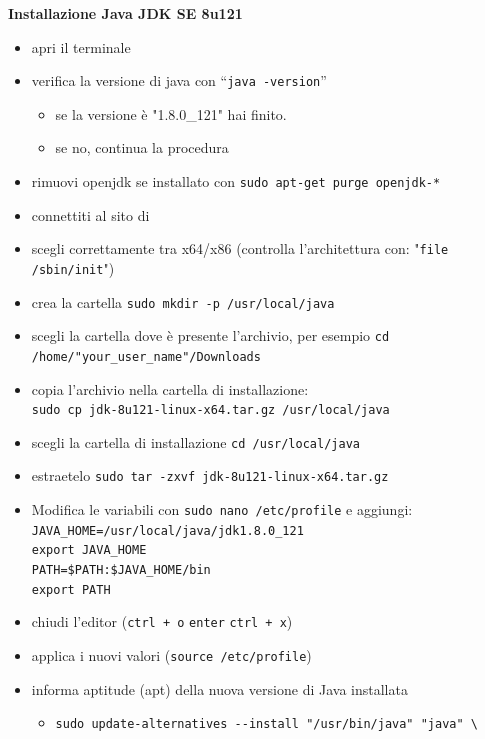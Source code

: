 \documentclass{article}
\begin{document}
\textbf{Installazione Java JDK SE 8u121}
\begin{itemize}
\item apri il terminale
\item  verifica la versione di java con ``\texttt{java -version}''
\begin{itemize}
\item se la versione \`e "1.8.0\_121" hai finito.
\item se no, continua la procedura
\end{itemize}
\item rimuovi openjdk se installato con \texttt{sudo apt-get purge openjdk-*}
\item connettiti al sito di
  \href{http://www.oracle.com/technetwork/java/javase/downloads/jdk8-downloads-2133151.html}{}
\item scegli correttamente tra x64/x86 (controlla l'architettura con:  "\texttt{file /sbin/init}")
\item crea la cartella \texttt{sudo mkdir -p /usr/local/java}
\item scegli la cartella dove \`e presente l'archivio, per esempio \texttt{cd /home/"your\_user\_name"/Downloads}
\item copia l'archivio nella cartella di installazione:\\
	\verb!sudo cp jdk-8u121-linux-x64.tar.gz /usr/local/java!
\item scegli la cartella di installazione \texttt{cd /usr/local/java}
\item estraetelo \texttt{sudo tar -zxvf jdk-8u121-linux-x64.tar.gz}
\item Modifica le variabili con \texttt{sudo nano /etc/profile}  e
  aggiungi: \\
\texttt{JAVA\_HOME=/usr/local/java/jdk1.8.0\_121} \\
\texttt{export JAVA\_HOME}\\
\texttt{PATH=\$PATH:\$JAVA\_HOME/bin}\\
\texttt{export PATH}
\item chiudi l'editor (\texttt{ctrl + o} \texttt{enter} \texttt{ctrl + x})
\item applica i nuovi valori (\texttt{source /etc/profile})
\item informa aptitude (apt) della nuova versione di Java installata
\begin{itemize}
\item \verb!sudo update-alternatives --install "/usr/bin/java" "java" \! \\

\end{itemize}
\end{itemize}
\end{document}
